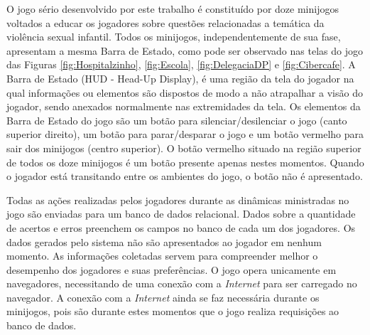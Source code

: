 O jogo sério desenvolvido por este trabalho é constituído por doze minijogos voltados a educar os jogadores sobre questões relacionadas a temática da violência sexual infantil. Todos os minijogos, independentemente de sua fase, apresentam a mesma Barra de Estado, como pode ser observado nas telas do jogo das Figuras \ref{fig:Hospitalzinho}, \ref{fig:Escola}, \ref{fig:DelegaciaDP} e \ref{fig:Cibercafe}. A Barra de Estado (HUD - Head-Up Display), é uma região da tela do jogador na qual informações ou elementos são dispostos de modo a não atrapalhar a visão do jogador, sendo anexados normalmente nas extremidades da tela. Os elementos da Barra de Estado do jogo são um botão para silenciar/desilenciar o jogo (canto superior direito), um botão para parar/desparar o jogo e um botão vermelho para sair dos minijogos (centro superior). O botão vermelho situado na região superior de todos os doze minijogos é um botão presente apenas nestes momentos. Quando o jogador está transitando entre os ambientes do jogo, o botão não é apresentado. 


Todas as ações realizadas pelos jogadores durante as dinâmicas ministradas no jogo são enviadas para um banco de dados relacional. Dados sobre a quantidade de acertos e erros preenchem os campos no banco de cada um dos jogadores. Os dados gerados pelo sistema não são apresentados ao jogador em nenhum momento. As informações coletadas servem para compreender melhor o desempenho dos jogadores e suas preferências. O jogo opera unicamente em navegadores, necessitando de uma conexão com a \textit{Internet} para ser carregado no navegador. A conexão com a \textit{Internet} ainda se faz necessária durante os minijogos, pois são durante estes momentos que o jogo realiza requisições ao banco de dados. 





